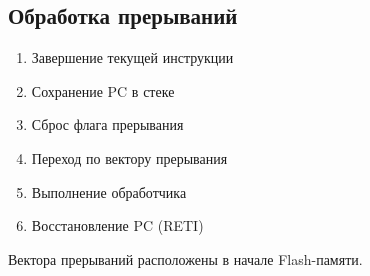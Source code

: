 \documentclass[a4paper,12pt]{article}
\begin{document}
\subsection{Обработка прерываний}
\begin{enumerate}
    \item Завершение текущей инструкции
    \item Сохранение PC в стеке
    \item Сброс флага прерывания
    \item Переход по вектору прерывания
    \item Выполнение обработчика
    \item Восстановление PC (RETI)
\end{enumerate}

Вектора прерываний расположены в начале Flash-памяти.
\end{document}
